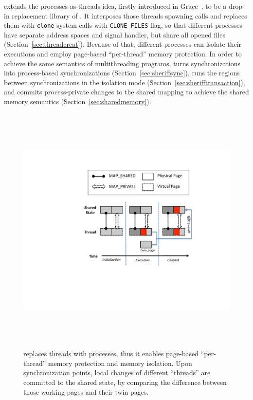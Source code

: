 \label{sec:sheriffframework}


%

\sheriff{} extends the processes-as-threads idea, firstly introduced in Grace~\cite{grace}, to be a drop-in replacement library of \pthreads{}. It interposes those threads spawning calls and replaces them with \texttt{clone} system calls with \texttt{CLONE\_FILES} flag, so that different processes have separate address spaces and signal handler, but share all opened files (Section~\ref{sec:threadcreat}). Because of that, different processes can isolate their executions and employ page-based ``per-thread'' memory protection. In order to achieve the same semantics of multithreading programs, \sheriff{} turns synchronizations into process-based synchronizations (Section~\ref{sec:sheriffsync}), runs the regions between synchronizations in the isolation mode (Section~\ref{sec:sherifftransaction}), and commits process-private changes to the shared mapping to achieve the shared memory semantics (Section~\ref{sec:sharedmemory}). 

\begin{figure}[!h]
\centering
\includegraphics[height=5in]{sheriff/figure/sheriffframework.pdf}
\caption{
\Sheriff{} replaces threads with processes, thus it enables page-based ``per-thread'' memory protection and memory isolation. Upon synchronization points, local changes of different ``threads'' are committed to the shared state, by comparing the difference between those working pages and their twin pages. \label{fig:overview}}
\end{figure}


